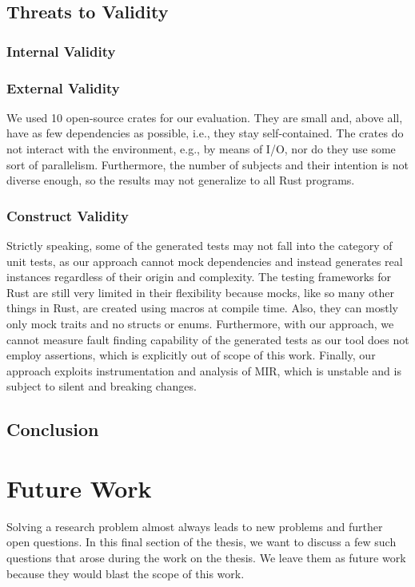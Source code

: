 \documentclass[paper=a4,%
  twoside,%
  BCOR4mm,%
  abstract=true,%
  toc=bibliography,%
  chapterprefix=true,%
  toc=bibliographynumbered,%
  open=right,%
  english,%
  pagesize=pdftex]{scrreprt}
\newcommand{\benchnum}{10\xspace}
\newcommand{\mir}{\ac{MIR}\xspace}
\begin{document}
\section{Threats to Validity}
\label{sec:threats-to-validity}
\subsection*{Internal Validity}

\subsection*{External Validity}
We used \benchnum open-source crates for our evaluation. They are small and, above all, have as few dependencies as possible, i.e., they stay self-contained. The crates do not interact with the environment, e.g., by means of I/O, nor do they use some sort of parallelism. Furthermore, the number of subjects and their intention is not diverse enough, so the results may not generalize to all Rust programs.

\subsection*{Construct Validity}
Strictly speaking, some of the generated tests may not fall into the category of unit tests, as our approach cannot mock dependencies and instead generates real instances regardless of their origin and complexity. The testing frameworks for Rust are still very limited in their flexibility because mocks, like so many other things in Rust, are created using macros at compile time. Also, they can mostly only mock traits and no structs or enums. Furthermore, with our approach, we cannot measure fault finding capability of the generated tests as our tool does not employ assertions, which is explicitly out of scope of this work. Finally, our approach exploits instrumentation and analysis of \mir, which is unstable and is subject to silent and breaking changes. 

\section{Conclusion}
\label{sec:discussion}

\clearpage
\chapter{Future Work}
\label{chap:future-work}
Solving a research problem almost always leads to new problems and further open questions. In this final section of the thesis, we want to discuss a few such questions that arose during the work on the thesis. We leave them as future work because they would blast the scope of this work. 
\end{document}
